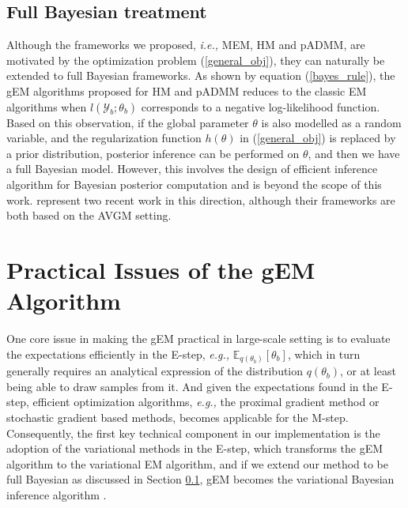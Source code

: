 \documentclass{article}
\newcommand{\ie}[0]{\emph{i.e., }}
\newcommand{\eg}[0]{\emph{e.g., }}
\newcommand{\1}[0]{\ensuremath{\boldsymbol{1}}\xspace}
\begin{document}
\subsection{Full Bayesian treatment}\label{Full_Bayesian}
Although the frameworks we proposed, \ie MEM, HM and pADMM, are motivated by the optimization problem (\ref{general_obj}), they can naturally be extended to full Bayesian frameworks. As shown by equation (\ref{bayes_rule}), the gEM algorithms proposed for HM and pADMM reduces to the classic EM algorithms when $l(\mathcal{Y}_b; \theta_b)$ corresponds to a negative log-likelihood function. Based on this observation, if the global parameter $\theta$ is also modelled as a random variable, and the regularization function $h(\theta)$ in (\ref{general_obj}) is replaced by a prior distribution, posterior inference can be performed on $\theta$, and then we have a full Bayesian model. However, this involves the design of efficient inference algorithm for Bayesian posterior computation and is beyond the scope of this work. \cite{Scott2013, Neiswanger2013} represent two recent work in this direction, although their frameworks are both based on the AVGM setting.


\section{Practical Issues of the gEM Algorithm}
One core issue in making the gEM practical in large-scale setting is to evaluate the expectations efficiently in the E-step, \eg $\mathbb{E}_{q(\theta_b)}[\theta_b]$, which in turn generally requires an analytical expression of the distribution $q(\theta_b)$, or at least being able to draw samples from it. And given the expectations found in the E-step, efficient optimization algorithms, \eg the proximal gradient method or stochastic gradient based methods, becomes applicable for the M-step. Consequently, the first key technical component in our implementation is the adoption of the variational methods \cite{Wainwright2008} in the E-step, which transforms the gEM algorithm to the variational EM algorithm, and if we extend our method to be full Bayesian as discussed in Section \ref{Full_Bayesian}, gEM becomes the variational Bayesian inference algorithm \cite{Bishop2006}.
\end{document}
